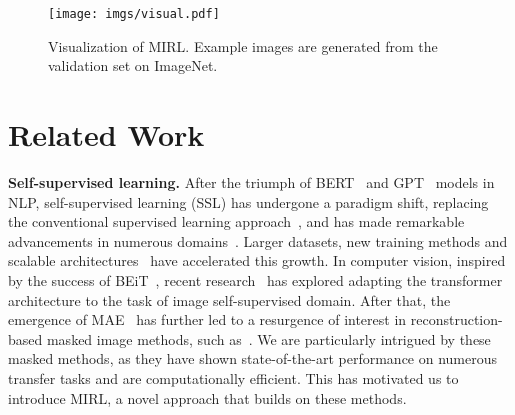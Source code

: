 \documentclass{article}
\begin{document}
\begin{figure}[!t]
\centering
\texttt{[image: imgs/visual.pdf]}
{\caption{\label{fig: visual_examples} Visualization of MIRL. Example images are generated from the validation set on ImageNet. 
}}
\end{figure}



\vspace{5pt}
\section{Related Work}
\vspace{5pt}
\textbf{Self-supervised learning.}
After the triumph of BERT~\cite{devlin2019bert} and GPT~\cite{radford2018improving} models in NLP, self-supervised learning (SSL) has undergone a paradigm shift, replacing the conventional supervised learning approach~\cite{he2016deep,tan2019efficientnet}, and has made remarkable advancements in numerous domains~\cite{pan2009survey,zhai2019large,kolesnikov2020big}. 
Larger datasets, new training methods and scalable architectures~\cite{mahajan2018exploring,dosovitskiy2020image,clip,zhai2022scaling} have accelerated this growth.
In computer vision, inspired by the success of BEiT~\cite{bao2021beit}, recent research~\cite{ermolov2021whitening,li2020prototypical,gidaris2020learning,henaff2020data,gidaris2020online,PriyaGoyal2021SelfsupervisedPO,zbontar2021barlow,bardes2021vicreg,ren2023deepmim,XiangyuPeng2022CraftingBC,wang2023masked} has explored adapting the transformer architecture to the task of image self-supervised domain. After that, the emergence of MAE~\cite{he2022masked} has further led to a resurgence of interest in reconstruction-based masked image methods, such as~\cite{he2022masked,el2021large,wei2021masked,xie2021simmim,dong2021peco}. We are particularly intrigued by these masked methods, as they have shown state-of-the-art performance on numerous transfer tasks and are computationally efficient. This has motivated us to introduce MIRL, a novel approach that builds on these methods.
 

 
\end{document}
